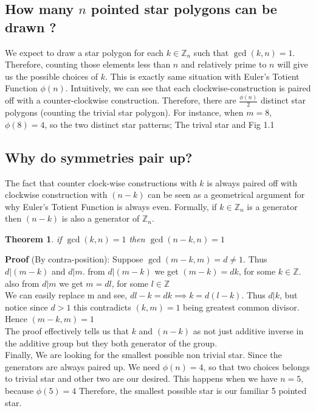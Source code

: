 \documentclass{article}
\newtheorem{theorem}{Theorem}[section]
\begin{document}
\subsection*{How many $n$ pointed star polygons can be drawn ?}
We expect to draw a star polygon for each $k \in \mathbb{Z}_ n$ such that $\gcd(k,n) = 1$. Therefore, counting those elements less than $n$ and relatively prime to $n$ will give us the possible choices of $k$. This is exactly same situation with Euler's Totient Function $\phi(n)$. Intuitively, we can see that each clockwise-construction is paired off with a counter-clockwise construction. Therefore, there are $\frac{\phi(n)}{2}$ distinct star polygons (counting the trivial star polygon). For instance, when $m =8$, $\phi(8) = 4$, so the two distinct star patterns; The trival star and Fig 1.1
\subsection*{Why do symmetries pair up?}
The fact that counter clock-wise constructions with $k$ is always paired off with clockwise construction with $(n-k)$ can be seen as a geometrical argument for why Euler's Totient Function is always even. Formally, if $k\in \mathbb{Z}_n$  is a generator then $(n-k)$ is also a generator of $\mathbb{Z}_n$.
\begin{theorem}
if $\gcd(k,n)=1$ then $\gcd(n-k,n)=1$
\end{theorem}
\textbf{Proof} (By contra-position): Suppose $\gcd(m-k,m)=d \neq 1$. Thus $d|(m-k)$ and $d|m$. from $d|(m-k)$ we get $(m-k)=dk$, for some $k \in \mathbb{Z}$. also from $d|m$ we get $m=dl$, for some $l \in \mathbb{Z}$\\[2mm]
We can easily replace m and see, $dl-k=dk \implies k=d(l-k)$. 
Thus $d|k$, but notice since $d>1$ this contradicts $(k,m)=1$ being greatest common divisor. Hence $(m-k,m)=1$\\[2mm]
The proof effectively tells us that $k$ and $(n-k)$ as not just additive inverse in the additive group but they both generator of the group.\\[2mm]
Finally, We are looking for the smallest possible non trivial star. Since the generators are always paired up. We need $\phi(n) = 4$, so that two choices belongs to trivial star and other two are our desired. This happens when we have $n=5$, because $\phi(5) = 4$ Therefore, the smallest possible star is our familiar 5 pointed star.\\

\newpage
\end{document}
